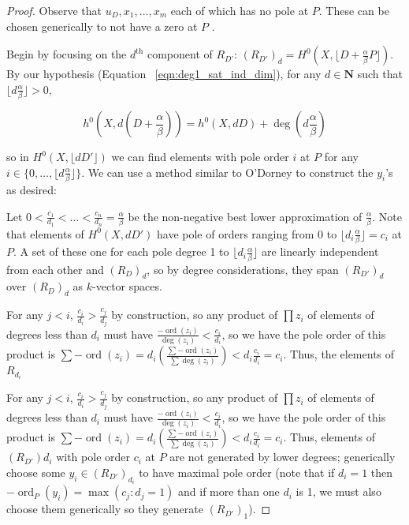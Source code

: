 \documentclass{amsart}
\theoremstyle{plain}
\theoremstyle{definition}
\theoremstyle{remark}
\numberwithin{equation}{section}
\DeclareMathOperator{\ord}{ord}
\begin{document}
\begin{proof}
Observe that $u_D,x_1,...,x_m$ each of which has no pole at $P$.
These can be chosen generically to not have a zero at $P$ .

Begin by focusing on the $d^{\text{th}}$ component of $R_{D'}$: $(R_
{D'})_d = H^0(X, \lfloor D + \frac{\alpha}{\beta} P \rfloor)$. By
our hypothesis (Equation ~\ref{eqn:deg1_sat_ind_dim}), for any $d
\in \mathbf{N}$ such that $\lfloor d \frac{ \alpha}{\beta} \rfloor > 0$,

\[
	h^0 (X, d(D+\frac{\alpha}{\beta})) = h^0(X, dD) + \deg(d\frac{\alpha}{\beta})
\]

\noindent
so in $H^0 (X, \lfloor dD' \rfloor)$ we can find elements with pole
order $i$ at $P$ for any $i \in \{0, \ldots, \lfloor d \frac{\alpha}{
\beta} \rfloor \}$. We can use a method similar to O'Dorney to
construct the $y_i$'s as desired: 

Let $0 < \frac{c_1}{d_1} < \ldots < \frac{c_n}{d_n} = \frac{\alpha}{
\beta}$ be the non-negative best lower approximation of $\frac{
\alpha}{\beta}$.  Note that elements of $H^0(X,dD')$ have pole of
orders ranging from 0 to $\lfloor d_i \frac{\alpha}{\beta}\rfloor =
c_i $ at $P$. A set of these one for each pole degree 1 to $\lfloor
d_i \frac{\alpha}{\beta} \rfloor$ are linearly independent from
each other and $(R_D)_d$, so by degree considerations, they span
$(R_{D'})_d$ over $(R_D)_d$ as $k$-vector spaces. 

For any $j < i$, $\frac{c_i}{d_i} > \frac{c_j}{d_j}$
by construction, so any product of $\prod z_i$ of elements of
degrees less than $d_i$ must have $\frac{-\ord(z_i)}{\deg(z_i)} <
\frac{c_i}{d _i}$, so we have the pole order of this product is $
\sum -\ord(z_i) = d_i(\frac{\sum -\ord( z_i)}{\sum \deg( z_i)}) < d_
i\frac{c_i}{d_i} = c_i $. Thus, the elements of $R_{d_i}$

For any $j<i$, $\frac{c_i}{d_i}>\frac{c_j}{d_j}$ by construction,
so any product of $\prod z_i$ of elements of degrees less than $d_i$
 must have $\frac{-\ord(z_i)}{\deg(z_i)}<\frac{c_i}{d_i} $, so we
have the pole order of this product is $\sum -\ord(z_i)=d_i(\frac{
\sum -\ord( z_i)} {\sum \deg( z_i)})<d_i\frac{c_i}{d_i}=c_i$.
Thus, elements of $(R_{D'})d_i$ with pole order $c_i$ at $P$ are
not generated by lower degrees; generically choose some $y_i \in(R_{
D'})_{d_i}$ to have maximal pole order (note that if $d_i=1$ then $-
\ord_P(y_i)= \max(c_j:d_j=1)$ and if more than one $d_i$ is 1, we
must also choose them generically so they generate $(R_{D'})_1$).


\end{proof}
\end{document}
